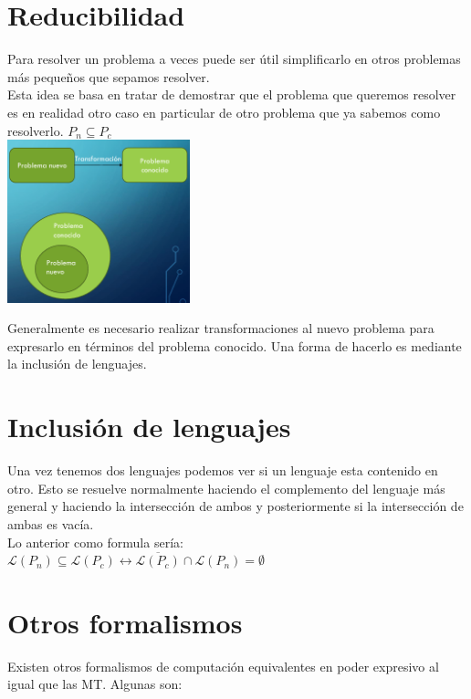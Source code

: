 \documentclass{article}
\begin{document}
\section{Reducibilidad}
Para resolver un problema a veces puede ser útil simplificarlo en otros problemas
más pequeños que sepamos resolver.\\

Esta idea se basa en tratar de demostrar que el problema que queremos resolver
es en realidad otro caso en particular de otro problema que ya sabemos como
resolverlo. $P_n \subseteq P_c$\\

\includegraphics[width=200px]{../imgs/reducibilidad.png}

Generalmente es necesario realizar transformaciones al nuevo problema para
expresarlo en términos del problema conocido. Una forma de hacerlo es mediante
la inclusión de lenguajes.

\section{Inclusión de lenguajes}
Una vez tenemos dos lenguajes podemos ver si un lenguaje esta contenido en otro.
Esto se resuelve normalmente haciendo el complemento del lenguaje más general y
haciendo la intersección de ambos y posteriormente si la intersección de ambas
es vacía.\\

Lo anterior como formula sería:\\

$\mathcal{L}(P_n) \subseteq \mathcal{L}(P_c) \leftrightarrow 
\overline{\mathcal{L}(P_c)} \cap \mathcal{L}(P_n) = \emptyset$

\newpage

\section{Otros formalismos}

Existen otros formalismos de computación equivalentes en poder expresivo
al igual que las MT. Algunas son:\\
\end{document}
